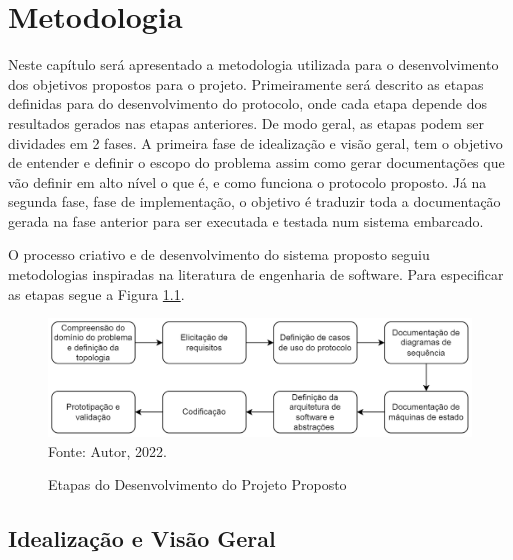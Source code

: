 \chapter{Metodologia}

Neste capítulo será apresentado a metodologia utilizada para o desenvolvimento
dos objetivos propostos para o projeto. Primeiramente será descrito as etapas
definidas para do desenvolvimento do protocolo, onde cada etapa depende dos
resultados gerados nas etapas anteriores. De modo geral, as etapas podem ser
dividades em 2 fases. A primeira fase de idealização e visão geral, tem o
objetivo de entender e definir o escopo do problema assim como gerar documentações
que vão definir em alto nível o que é, e como funciona o protocolo proposto.
Já na segunda fase, fase de implementação, o objetivo é traduzir toda a
documentação gerada na fase anterior para ser executada e testada num sistema
embarcado. \newline

O processo criativo e de desenvolvimento do sistema proposto seguiu metodologias
inspiradas na literatura de engenharia de software. Para especificar as etapas
segue a Figura \ref{fig:es}.

\begin{figure}[h]
	\begin{center}
	\caption{Etapas do Desenvolvimento do Projeto Proposto}
    \includegraphics[width=\textwidth]{img/es.drawio.png}
    Fonte: Autor, 2022.
    \label{fig:es}
	\end{center}
\end{figure}

\section{Idealização e Visão Geral}


